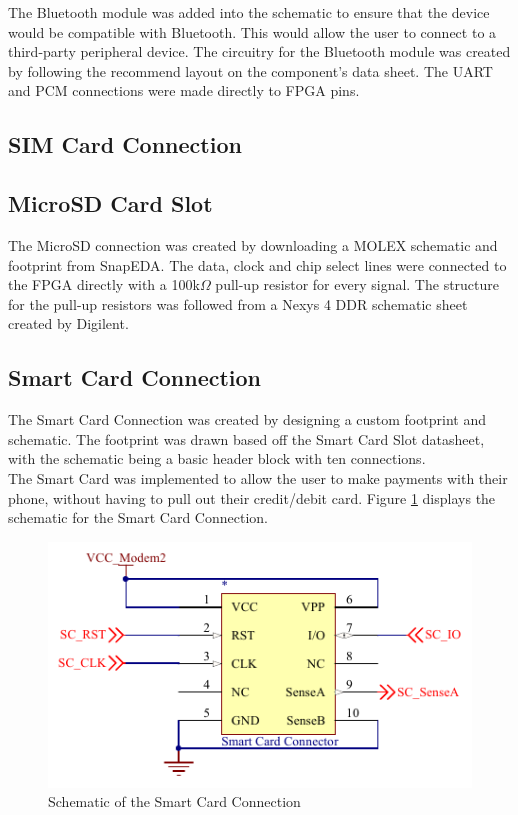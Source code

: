 	The Bluetooth module was added into the schematic to ensure that the device would be compatible with Bluetooth. This would allow the user to connect to a third-party peripheral device.
The circuitry for the Bluetooth module was created by following the recommend layout on the component's data sheet. The UART and PCM connections were made directly to FPGA pins. 

\subsection{SIM Card Connection}
\label{chap:SIM}

\subsection{MicroSD Card Slot}
\label{chap:SD}

	The MicroSD connection was created by downloading a MOLEX schematic and footprint from SnapEDA. The data, clock and chip select lines were connected to the FPGA directly with a 100k$\Omega$ pull-up resistor for every signal. The structure for the pull-up resistors was followed from a Nexys 4 DDR schematic sheet created by Digilent. 

\subsection{Smart Card Connection}
\label{chap:SC}

	The Smart Card Connection was created by designing a custom footprint and schematic. 
The footprint was drawn based off the Smart Card Slot datasheet, with the schematic being a basic header block with ten connections.\\
The Smart Card was implemented to allow the user to make payments with their phone, without having to pull out their credit/debit card.
Figure \ref{fig:SC} displays the schematic for the Smart Card Connection. 

\begin{figure}
	\includegraphics[width=0.5\linewidth]{Figures/SC.pdf}\centering
	\caption{Schematic of the Smart Card Connection}
	\label{fig:SC}
\end{figure}

